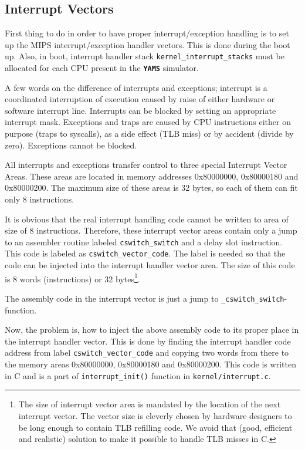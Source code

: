 \documentclass[twoside,a4paper]{report}
\newcommand{\yams}{\texttt{\textbf{YAMS}}}
\begin{document}
\subsection{Interrupt Vectors}

First thing to do in order to have proper interrupt/exception handling
is to set up the MIPS interrupt/exception handler vectors. This is
done during the boot up. Also, in boot, interrupt handler stack
\texttt{kernel\_interrupt\_stacks} must be allocated for each CPU
present in the \yams{} simulator.

A few words on the difference of interrupts and exceptions; interrupt
is a coordinated interruption of execution caused by raise of either
hardware or software interrupt line. Interrupts can be blocked by
setting an appropriate interrupt mask. Exceptions and traps are caused by
CPU instructions either on purpose (traps to syscalls), as a side
effect (TLB miss) or by accident (divide by zero). Exceptions cannot
be blocked.

All interrupts and exceptions transfer control to three special
Interrupt Vector Areas. These areas are located in memory addresses
0x80000000, 0x80000180 and 0x80000200. The maximum size of these areas is
32 bytes, so each of them can fit only 8 instructions.

It is obvious that the real interrupt handling code cannot be written
to area of size of 8 instructions. Therefore, these interrupt vector
areas contain only a jump to an assembler routine labeled
\texttt{cswitch\_switch} and a delay slot instruction. This code is
labeled as \texttt{cswitch\_vector\_code}. The label is needed so that
the code can be injected into the interrupt handler vector area. The
size of this code is 8 words (instructions) or 32 bytes\footnote{The
size of interrupt vector area is mandated by the location of the next
interrupt vector. The vector size is cleverly chosen by hardware
designers to be long enough to contain TLB refilling code. We avoid
that (good, efficient and realistic) solution to make it possible to
handle TLB misses in C.}.

The assembly code in the interrupt vector is just a jump to
\texttt{\_cswitch\_switch}-function.

Now, the problem is, how to inject the above assembly code to its
proper place in the interrupt handler vector. This is done by finding
the interrupt handler code address from label
\texttt{cswitch\_vector\_code} and copying two words from there to the
memory areas 0x80000000, 0x80000180 and 0x80000200. This code is
written in C and is a part of \texttt{interrupt\_init()} function in
\texttt{kernel/interrupt.c}.
\end{document}
